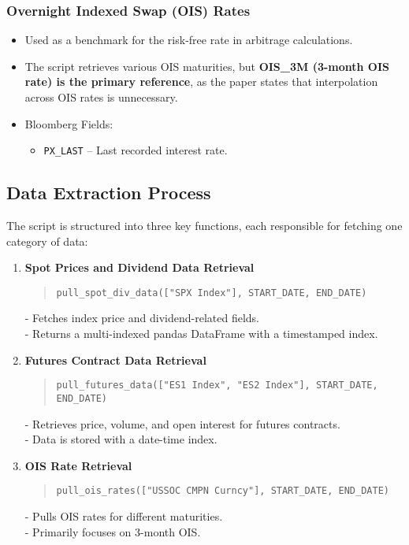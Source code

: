 \documentclass{article}
\begin{document}
\subsubsection{Overnight Indexed Swap (OIS) Rates}
\begin{itemize}
  \item Used as a benchmark for the risk-free rate in arbitrage calculations.
  \item The script retrieves various OIS maturities, but \textbf{OIS\_3M (3-month OIS rate) is the primary reference}, as the paper states that interpolation across OIS rates is unnecessary.
  \item Bloomberg Fields:
  \begin{itemize}
    \item \texttt{PX\_LAST} -- Last recorded interest rate.
  \end{itemize}
\end{itemize}

\subsection{Data Extraction Process}
The script is structured into three key functions, each responsible for fetching one category of data:

\begin{enumerate}
  \item \textbf{Spot Prices and Dividend Data Retrieval}
  \begin{quote}
    \texttt{pull\_spot\_div\_data(["SPX Index"], START\_DATE, END\_DATE)}
  \end{quote}
  - Fetches index price and dividend-related fields.\\
  - Returns a multi-indexed pandas DataFrame with a timestamped index.

  \item \textbf{Futures Contract Data Retrieval}
  \begin{quote}
    \texttt{pull\_futures\_data(["ES1 Index", "ES2 Index"], START\_DATE, END\_DATE)}
  \end{quote}
  - Retrieves price, volume, and open interest for futures contracts.\\
  - Data is stored with a date-time index.

  \item \textbf{OIS Rate Retrieval}
  \begin{quote}
    \texttt{pull\_ois\_rates(["USSOC CMPN Curncy"], START\_DATE, END\_DATE)}
  \end{quote}
  - Pulls OIS rates for different maturities.\\
  - Primarily focuses on 3-month OIS.
\end{enumerate}
\end{document}
